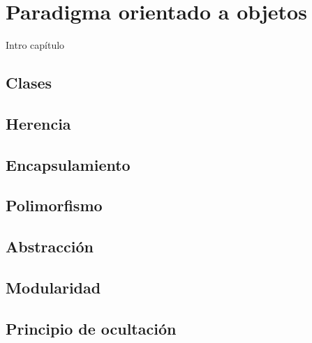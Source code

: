 \chapter{Paradigma orientado a objetos}

\label{Chapter4}


Intro capítulo


\section{Clases}

\section{Herencia}

\section{Encapsulamiento}

\section{Polimorfismo}

\section{Abstracción}

\section{Modularidad}

\section{Principio de ocultación}